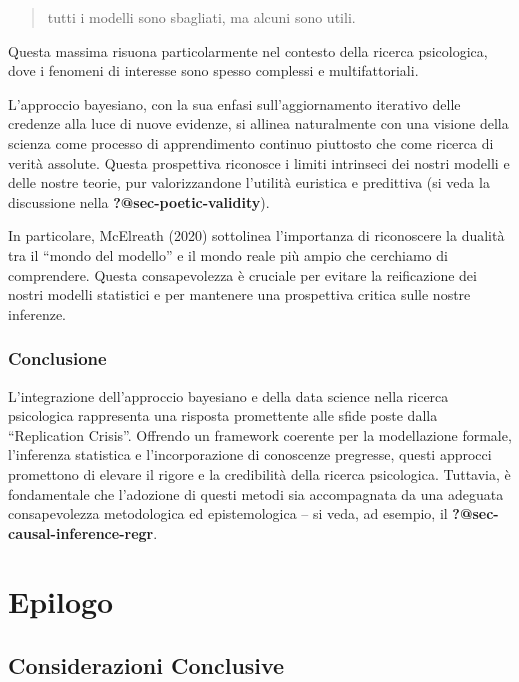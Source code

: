 \documentclass[
  letterpaper,
  krantz2]{{[}./krantz{]}}
\begin{document}
\begin{quote}
tutti i modelli sono sbagliati, ma alcuni sono utili.
\end{quote}

Questa massima risuona particolarmente nel contesto della ricerca
psicologica, dove i fenomeni di interesse sono spesso complessi e
multifattoriali.

L'approccio bayesiano, con la sua enfasi sull'aggiornamento iterativo
delle credenze alla luce di nuove evidenze, si allinea naturalmente con
una visione della scienza come processo di apprendimento continuo
piuttosto che come ricerca di verità assolute. Questa prospettiva
riconosce i limiti intrinseci dei nostri modelli e delle nostre teorie,
pur valorizzandone l'utilità euristica e predittiva (si veda la
discussione nella \textbf{?@sec-poetic-validity}).

In particolare, McElreath (2020) sottolinea l'importanza di riconoscere
la dualità tra il ``mondo del modello'' e il mondo reale più ampio che
cerchiamo di comprendere. Questa consapevolezza è cruciale per evitare
la reificazione dei nostri modelli statistici e per mantenere una
prospettiva critica sulle nostre inferenze.

\section{Conclusione}\label{conclusione-1}

L'integrazione dell'approccio bayesiano e della data science nella
ricerca psicologica rappresenta una risposta promettente alle sfide
poste dalla ``Replication Crisis''. Offrendo un framework coerente per
la modellazione formale, l'inferenza statistica e l'incorporazione di
conoscenze pregresse, questi approcci promettono di elevare il rigore e
la credibilità della ricerca psicologica. Tuttavia, è fondamentale che
l'adozione di questi metodi sia accompagnata da una adeguata
consapevolezza metodologica ed epistemologica -- si veda, ad esempio, il
\textbf{?@sec-causal-inference-regr}.

\part{Epilogo}

\chapter*{Considerazioni Conclusive}\label{considerazioni-conclusive}
\end{document}
